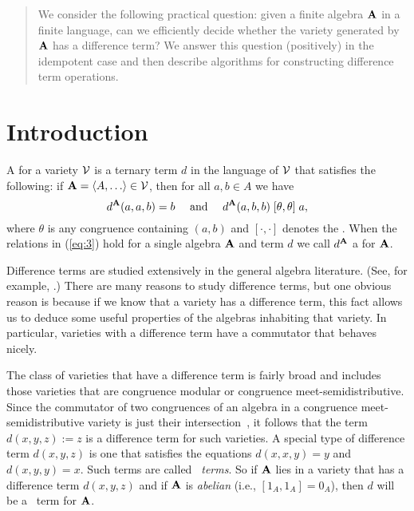 \documentclass{ws-ijac}
\begin{document}
\begin{history}
\comby{[editor]}
\end{history}

\begin{abstract}
We consider the following practical question: given a finite
algebra $\mathbf{A}$ in a
finite language, can we efficiently decide whether the variety
generated by $\mathbf{A}$
has a difference term?  We answer this question (positively) in the
idempotent case and then describe algorithms for constructing difference
term operations.
\end{abstract}

\section{Introduction}
\label{sec:introduction}

A  for a variety $\mathcal{V}$ is a ternary term $d$ in the
language of $\mathcal{V}$ that satisfies the following:
if $\alg{A} = \<A, \dots \> \in \sV$, then for all $a, b \in A$ we have
\begin{equation}
\label{eq:3}
d^{\alg{A}}(a,a,b) = b \quad \text{ and } \quad
d^{\alg{A}}(a,b,b) \mathrel{\comm \theta \theta} a,
\end{equation}
where $\theta$ is any congruence %
containing $(a,b)$
and $[\cdot, \cdot]$ denotes the .
When the relations in (\ref{eq:3}) hold for a single algebra $\mathbf{A}$ and term $d$ we call $d^{\mathbf{A}}$
a  for $\mathbf{A}$.

Difference terms are studied extensively in the general algebra literature.
(See, for example, \cite{MR1358491,MR1663558,MR3076179,KSW,MR3449235}.)
There are many reasons to study difference terms, but
one obvious reason is because if we know that a variety
has a difference term, this fact allows us to deduce some useful
properties of the algebras inhabiting that variety.
In particular, varieties with a difference term have a commutator that behaves nicely.  

The class of varieties that have a difference term is fairly broad and includes those varieties that are congruence modular or congruence meet-semidistributive. Since the commutator of two congruences of an algebra in a congruence meet-semidistributive variety is just their intersection~\cite{MR1663558}, it follows that the term $d(x,y,z) := z$ is a difference term for such varieties.  A special type of difference term $d(x,y,z)$ is one that satisfies the equations $d(x,x,y) = y$ and $d(x,y,y) = x$.  Such terms are called \emph{\malcev\ terms}. So if $\mathbf{A}$ lies in a variety that has a difference term $d(x,y,z)$ and if $\mathbf{A}$ is \emph{abelian} (i.e., $[1_A, 1_A] = 0_A$), then $d$ will be a \malcev\ term for $\mathbf{A}$.
\end{document}
